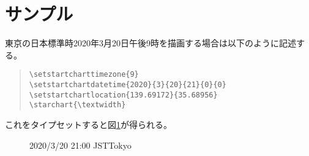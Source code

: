\documentclass[autodetect-engine,dvi=dvipdfmx,ja=standard,a4paper]{bxjsarticle}
\begin{document}
\section{サンプル}

東京の日本標準時2020年3月20日午後9時を描画する場合は以下のように記述する。
\begin{quote}\begin{verbatim}
\setstartcharttimezone{9}
\setstartchartdatetime{2020}{3}{20}{21}{0}{0}
\setstartchartlocation{139.69172}{35.68956}
\starchart{\textwidth}
\end{verbatim}\end{quote}
これをタイプセットすると図\ref{fig1}が得られる。

\begin{figure}
  \starchart{\textwidth}
  \caption{2020/3/20 21:00 JST\quad Tokyo}
  \label{fig1}
\end{figure}
\end{document}
